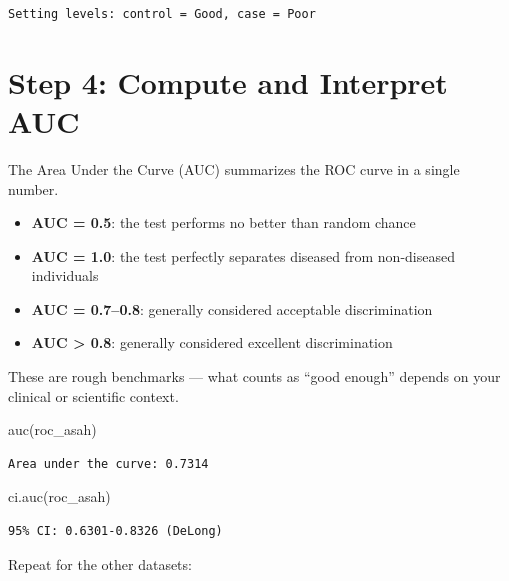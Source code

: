 \documentclass[
  letterpaper,
  DIV=11,
  numbers=noendperiod]{scrreprt}
\newenvironment{Shaded}{\begin{snugshade}}{\end{snugshade}}
\newcommand{\AttributeTok}[1]{\textcolor[rgb]{0.40,0.45,0.13}{#1}}
\newcommand{\FunctionTok}[1]{\textcolor[rgb]{0.28,0.35,0.67}{#1}}
\newcommand{\NormalTok}[1]{\textcolor[rgb]{0.00,0.23,0.31}{#1}}
\newcommand{\OtherTok}[1]{\textcolor[rgb]{0.00,0.23,0.31}{#1}}
\newcommand{\SpecialCharTok}[1]{\textcolor[rgb]{0.37,0.37,0.37}{#1}}
\newcommand{\StringTok}[1]{\textcolor[rgb]{0.13,0.47,0.30}{#1}}
\providecommand{\tightlist}{%
  \setlength{\itemsep}{0pt}\setlength{\parskip}{0pt}}\usepackage{longtable,booktabs,array}
\begin{document}
\begin{verbatim}
Setting levels: control = Good, case = Poor
\end{verbatim}

\section{Step 4: Compute and Interpret
AUC}\label{step-4-compute-and-interpret-auc}

The Area Under the Curve (AUC) summarizes the ROC curve in a single
number.

\begin{itemize}
\tightlist
\item
  \textbf{AUC = 0.5}: the test performs no better than random chance
\item
  \textbf{AUC = 1.0}: the test perfectly separates diseased from
  non-diseased individuals
\item
  \textbf{AUC = 0.7--0.8}: generally considered acceptable
  discrimination
\item
  \textbf{AUC \textgreater{} 0.8}: generally considered excellent
  discrimination
\end{itemize}

These are rough benchmarks --- what counts as ``good enough'' depends on
your clinical or scientific context.

\begin{Shaded}
\begin{Highlighting}[]
\FunctionTok{auc}\NormalTok{(roc\_asah)}
\end{Highlighting}
\end{Shaded}

\begin{verbatim}
Area under the curve: 0.7314
\end{verbatim}

\begin{Shaded}
\begin{Highlighting}[]
\FunctionTok{ci.auc}\NormalTok{(roc\_asah)}
\end{Highlighting}
\end{Shaded}

\begin{verbatim}
95% CI: 0.6301-0.8326 (DeLong)
\end{verbatim}

Repeat for the other datasets:

\begin{Shaded}
\end{Shaded}
\end{document}
